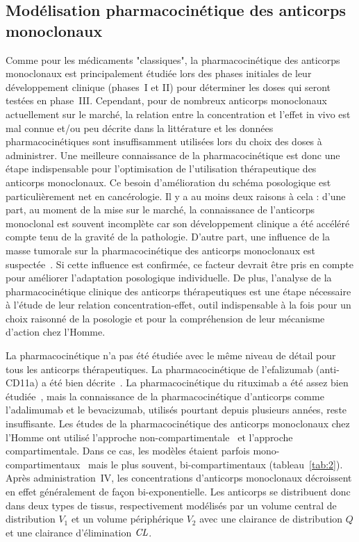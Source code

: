 \subsection{Modélisation pharmacocinétique des anticorps monoclonaux}
Comme pour les médicaments "classiques", la pharmacocinétique des anticorps monoclonaux est principalement étudiée lors des phases initiales de leur développement clinique (phases~I et II) pour déterminer les doses qui seront testées en phase~III. Cependant, pour de nombreux anticorps monoclonaux actuellement sur le marché, la relation entre la concentration et l'effet in vivo est mal connue et/ou peu décrite dans la littérature et les données pharmacocinétiques sont insuffisamment utilisées lors du choix des doses à administrer. Une meilleure connaissance de la pharmacocinétique est donc une étape indispensable pour l'optimisation de l'utilisation thérapeutique des anticorps monoclonaux. Ce besoin d'amélioration du schéma posologique est particulièrement net en cancérologie. Il y a au moins deux raisons à cela : d'une part, au moment de la mise sur le marché, la connaissance de l'anticorps monoclonal est souvent incomplète car son développement clinique a été accéléré compte tenu de la gravité de la pathologie. D'autre part, une influence de la masse tumorale sur la pharmacocinétique des anticorps monoclonaux est suspectée~\citep{REF45, REF46, REF47}. Si cette influence est confirmée, ce facteur devrait être pris en compte pour améliorer l'adaptation posologique individuelle. De plus, l'analyse de la pharmacocinétique clinique des anticorps thérapeutiques est une étape nécessaire à l'étude de leur relation concentration-effet, outil indispensable à la fois pour un choix raisonné de la posologie et pour la compréhension de leur mécanisme d'action chez l'Homme. 

La pharmacocinétique n'a pas été étudiée avec le même niveau de détail pour tous les anticorps thérapeutiques. La pharmacocinétique de l'efalizumab (anti-CD11a) a été bien décrite~\citep{REF48, REF49, REF50}. La pharmacocinétique du rituximab a été assez bien étudiée~\citep{REF51, REF52}, mais la connaissance de la pharmacocinétique d'anticorps comme l'adalimumab et le bevacizumab, utilisés pourtant depuis plusieurs années, reste insuffisante. Les études de la pharmacocinétique des anticorps monoclonaux chez l'Homme ont utilisé l'approche non-compartimentale~\citep{REF53,REF54, REF55, REF56, REF57, REF58, REF59} et l'approche compartimentale. Dans ce cas, les modèles étaient parfois mono-compartimentaux~\citep{REF60} mais le plus souvent, bi-compartimentaux (tableau~\ref{tab:2}). Après administration~IV, les concentrations d'anticorps monoclonaux décroissent en effet généralement de façon bi-exponentielle. Les anticorps se distribuent donc dans deux types de tissus, respectivement modélisés par un volume central de distribution $V_1$ et un volume périphérique $V_2$ avec une clairance de distribution $Q$ et une clairance d'élimination $\operatorname{\textit{CL}}$. 

